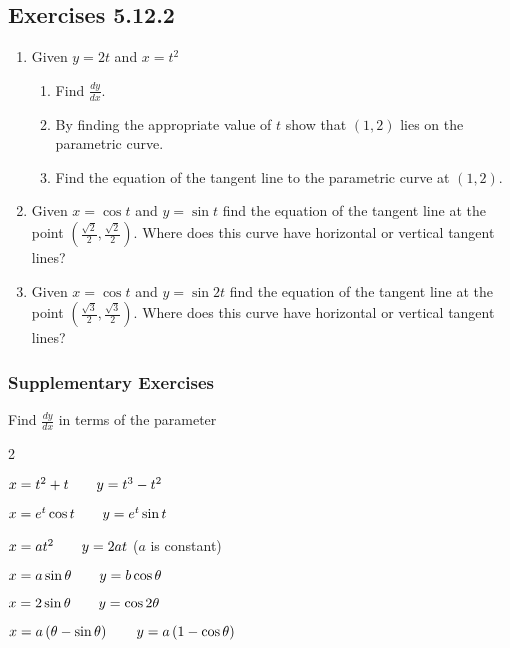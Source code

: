 \subsection{Exercises 5.12.2}
\begin{enumerate}
\item Given $y =2 t$ and $x =t^{2}$ 


\begin{enumerate}
\item Find $\frac{d y}{d x}$. 

\item By finding the appropriate value of $t$ show that $(1 ,2)$ lies on the parametric curve. 

\item Find
the equation of the tangent line to the parametric curve at $(1 ,2)$. \end{enumerate}


\item Given
$x =\cos  t$ and $y =\sin  t$ find the equation of the tangent line at the point $\left (\frac{\sqrt{2}}{2} ,\frac{\sqrt{2}}{2}\right )$. Where does this curve
have horizontal or vertical tangent lines? 

\item Given $x =\cos  t$ and $y =\sin  2 t$ find the equation of the tangent line at the point $\left (\frac{\sqrt{3}}{2} ,\frac{\sqrt{3}}{2}\right )$. Where does this curve
have horizontal or vertical tangent lines? \end{enumerate}


\subsubsection{Supplementary Exercises}
Find $\frac{d y}{d x}$ in terms of the parameter 


\begin{enumerate}
   

\columnsep =30pt
\begin {multicols}{2}
\item $x =t^{2} +t\text{\quad \quad }y =t^{3} -t^{2}$ 

\item $x =e^{t} \cos  t\text{\quad \quad }y =e^{t} \sin  t$ 

\item $x =a t^{2}\text{\quad \quad }y =2 a t$ ($a$ is constant) 

\item $x =a \sin  \theta \text{\quad \quad }y =b \cos  \theta $ 

\item $x =2 \sin  \theta \text{\quad \quad }y =\cos  2 \theta $ 

\item $x =a \left (\theta  -\sin  \theta \right )\text{\quad \quad }y =a \left (1 -\cos  \theta \right )$ 
\end {multicols}
 \end{enumerate}


